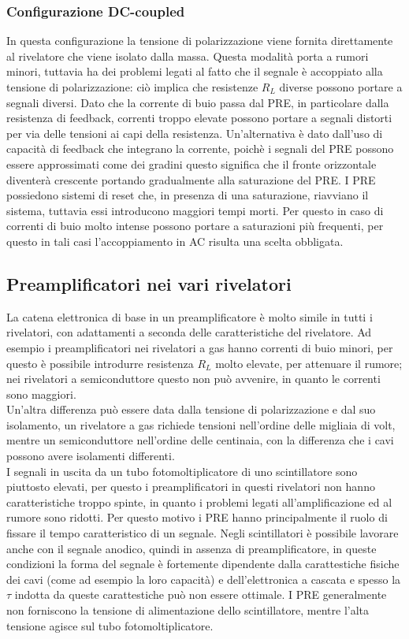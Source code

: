 \subsubsection{Configurazione DC-coupled}
In questa configurazione la tensione di polarizzazione viene fornita direttamente al rivelatore che viene isolato dalla massa. 
Questa modalit\`a porta a rumori minori, tuttavia ha dei problemi legati al fatto che il segnale \`e accoppiato alla tensione di polarizzazione:
ci\`o implica che resistenze $R_L$ diverse possono portare a segnali diversi.
Dato che la corrente di buio passa dal PRE, in particolare dalla resistenza di feedback, correnti troppo elevate possono portare a segnali distorti per via delle tensioni
ai capi della resistenza. 
Un'alternativa \`e dato dall'uso di capacit\`a di feedback che integrano la corrente, poich\`e i segnali del PRE possono essere approssimati come dei gradini
questo significa che il fronte orizzontale diventer\`a crescente portando gradualmente alla saturazione del PRE.
I PRE possiedono sistemi di reset che, in presenza di una saturazione, riavviano il sistema, tuttavia essi introducono maggiori tempi morti.
Per questo in caso di correnti di buio molto intense possono portare a saturazioni pi\`u frequenti, per questo in tali casi l'accoppiamento in AC risulta una scelta obbligata.
\subsection{Preamplificatori nei vari rivelatori}
La catena elettronica di base in un preamplificatore \`e molto simile in tutti i rivelatori, con adattamenti a seconda delle caratteristiche del rivelatore.
Ad esempio i preamplificatori nei rivelatori a gas hanno correnti di buio minori, per questo \`e possibile introdurre resistenza $R_L$ molto elevate, per attenuare il rumore;
nei rivelatori a semiconduttore questo non pu\`o avvenire, in quanto le correnti sono maggiori.\\
Un'altra differenza pu\`o essere data dalla tensione di polarizzazione e dal suo isolamento, un rivelatore a gas richiede tensioni nell'ordine delle migliaia di volt,
mentre un semiconduttore nell'ordine delle centinaia, con la differenza che i cavi possono avere isolamenti differenti.\\
I segnali in uscita da un tubo fotomoltiplicatore di uno scintillatore sono piuttosto elevati, per questo i preamplificatori in questi rivelatori non hanno
caratteristiche troppo spinte, in quanto i problemi legati all'amplificazione ed al rumore sono ridotti. 
Per questo motivo i PRE hanno principalmente il ruolo di fissare il tempo caratteristico di un segnale.
Negli scintillatori \`e possibile lavorare anche con il segnale anodico, quindi in assenza di preamplificatore, in queste condizioni la forma del segnale
\`e fortemente dipendente dalla carattestiche fisiche dei cavi (come ad esempio la loro capacit\`a) e dell'elettronica a cascata e spesso la $\tau$ indotta da queste carattestiche pu\`o non essere ottimale.
I PRE generalmente non forniscono la tensione di alimentazione dello scintillatore, mentre l'alta tensione agisce sul tubo fotomoltiplicatore.
